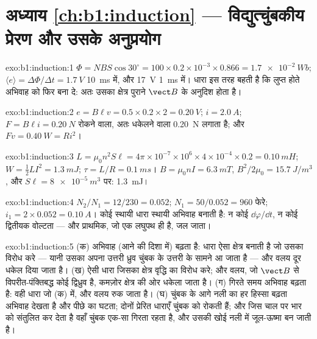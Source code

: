 \section*{अध्याय \ref{ch:b1:induction} --- विद्युत्चुंबकीय प्रेरण और उसके अनुप्रयोग}

\begin{solution}{exo:b1:induction:1}
$\Phi = NBS\cos30^\circ = 100 \times 0.2 \times 10^{-3} \times 0.866 = \qty{1.7e-2}{Wb}$;
$\langle e\rangle = \Delta\Phi/\Delta t = \qty{1.7}{V}$ \qty{10}{ms} में, और \qty{17}{V}
\qty{1}{ms} में। धारा इस तरह बहती है कि लुप्त होते अभिवाह को फिर बना दे:
अतः उसका क्षेत्र पुराने $\vect B$ के अनुदिश होता है।
\end{solution}

\begin{solution}{exo:b1:induction:2}
$e = B\ell v = 0.5 \times 0.2 \times 2 = \qty{0.20}{V}$; $i = \qty{2.0}{A}$; $F = B\ell i =
\qty{0.20}{N}$ रोकने वाला, अतः धकेलने वाला \qty{0.20}{N} लगाता है; और $Fv = \qty{0.40}{W}
= Ri^2$।
\end{solution}

\begin{solution}{exo:b1:induction:3}
$L = \mu_0n^2S\ell = 4\pi \times 10^{-7} \times 10^6 \times 4 \times 10^{-4} \times 0.2 =
\qty{0.10}{mH}$; $W = \tfrac12LI^2 = \qty{1.3}{mJ}$; $\tau = L/R = \qty{0.1}{ms}$।
$B = \mu_0nI = \qty{6.3}{mT}$, $B^2/2\mu_0 = \qty{15.7}{J/m^3}$, और
$S\ell = \qty{8e-5}{m^3}$ पर: \qty{1.3}{mJ}।
\end{solution}

\begin{solution}{exo:b1:induction:4}
$N_2/N_1 = 12/230 = 0.052$; $N_1 = 50/0.052 = 960$ फेरे; $i_1 = 2 \times 0.052 =
\qty{0.10}{A}$। कोई स्थायी धारा स्थायी अभिवाह बनाती है: न कोई $\dd\varphi/\dd t$,
न कोई द्वितीयक वोल्टता --- और प्राथमिक, जो एक लघुपथ ही है, जल जाता।
\end{solution}

\begin{solution}{exo:b1:induction:5}
(क) अभिवाह (आने की दिशा में) बढ़ता है: धारा ऐसा क्षेत्र बनाती है जो उसका
विरोध करे --- यानी उसका अपना उत्तरी ध्रुव चुंबक के उत्तरी के सामने आ जाता है
--- और वलय दूर धकेल दिया जाता है। (ख) ऐसी धारा जिसका क्षेत्र वृद्धि का विरोध
करे; और वलय, जो $\vect B$ से विपरीत-पंक्तिबद्ध कोई द्विध्रुव है, कमज़ोर
क्षेत्र की ओर धकेला जाता है। (ग) गिरते समय अभिवाह बढ़ता है: वही धारा जो (क)
में, और वलय रुक जाता है। (घ) चुंबक के आगे नली का हर हिस्सा बढ़ता अभिवाह देखता
है और पीछे का घटता; दोनों प्रेरित धाराएँ चुंबक को रोकती हैं; और जिस चाल पर
 भार को संतुलित कर देता है वहाँ चुंबक एक-सा गिरता रहता है, और उसकी
खोई  नली में जूल-ऊष्मा बन जाती है।
\end{solution}

